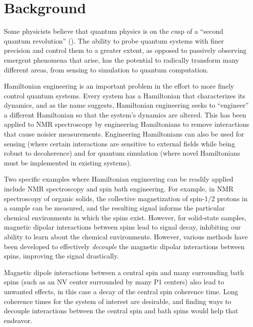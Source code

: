 \chapter{Background}


Some physicists believe that quantum physics is on the cusp of a ``second quantum revolution'' (\cite{quantum-rev}). The ability to probe quantum systems with finer precision and control them to a greater extent, as opposed to passively observing emergent phenomena that arise, has the potential to radically transform many different areas, from sensing to simulation to quantum computation.

Hamiltonian engineering is an important problem in the effort to more finely control quantum systems.
Every system has a Hamiltonian that characterizes its dynamics, and as the name suggests, Hamiltonian engineering seeks to ``engineer'' a different Hamiltonian so that the system's dynamics are altered. This has been applied to NMR spectroscopy by engineering Hamiltonians to remove interactions that cause noisier measurements. Engineering Hamiltonians can also be used for sensing (where certain interactions are sensitive to external fields while being robust to decoherence) and for quantum simulation (where novel Hamiltonians must be implemented in existing systems).

Two specific examples where Hamiltonian engineering can be readily applied include NMR spectroscopy and spin bath engineering. For example, in NMR spectroscopy of organic solids, the collective magnetization of spin-1/2 protons in a sample can be measured, and the resulting signal informs the particular chemical environments in which the spins exist. However, for solid-state samples, magnetic dipolar interactions between spins lead to signal decay,
inhibiting our ability to learn about the chemical environments. However, various methods have been developed to effectively \emph{decouple} the magnetic dipolar interactions between spins, improving the signal drastically.

Magnetic dipole interactions between a central spin and many surrounding bath spins (such as an NV center surrounded by many P1 centers) also lead to unwanted effects, in this case a decay of the central spin coherence time. Long coherence times for the system of interest are desirable, and finding ways to decouple interactions between the central spin and bath spins would help that endeavor.

